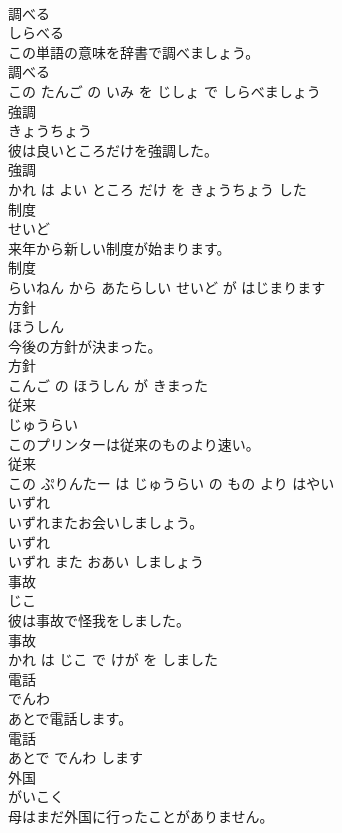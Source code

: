 \documentclass[8pt]{extreport}
\begin{document}
\begin{CJK}{UTF8}{min}
\\	調べる	
\\	しらべる			
\\	この単語の意味を辞書で調べましょう。	
\\	調べる 
\\	この たんご の いみ を じしょ で しらべましょう			
\\	強調	
\\	きょうちょう			
\\	彼は良いところだけを強調した。	
\\	強調 
\\	かれ は よい ところ だけ を きょうちょう した			
\\	制度	
\\	せいど			
\\	来年から新しい制度が始まります。	
\\	制度 
\\	らいねん から あたらしい せいど が はじまります			
\\	方針	
\\	ほうしん			
\\	今後の方針が決まった。	
\\	方針 
\\	こんご の ほうしん が きまった			
\\	従来	
\\	じゅうらい			
\\	このプリンターは従来のものより速い。	
\\	従来 
\\	この ぷりんたー は じゅうらい の もの より はやい			
\\	いずれ	
\\	いずれまたお会いしましょう。	
\\	いずれ 
\\	いずれ また おあい しましょう			
\\	事故	
\\	じこ			
\\	彼は事故で怪我をしました。	
\\	事故 
\\	かれ は じこ で けが を しました			
\\	電話	
\\	でんわ			
\\	あとで電話します。	
\\	電話 
\\	あとで でんわ します			
\\	外国	
\\	がいこく			
\\	母はまだ外国に行ったことがありません。	

\end{CJK}
\end{document}
